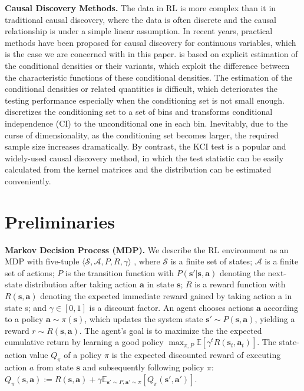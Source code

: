 \documentclass{article}
\theoremstyle{plain}
\theoremstyle{definition}
\theoremstyle{remark}
\begin{document}
\textbf{Causal Discovery Methods.}
The data in RL is more complex than it in traditional causal discovery, where the data is often discrete and the causal relationship is under a simple linear assumption.
In recent years, practical methods have been proposed for causal discovery for continuous variables, which is the case we are concerned with in this paper.
\cite{DBLP:conf/icml/SunJSF07} is based on explicit estimation of the conditional densities or their variants, which exploit the difference between the characteristic functions of these conditional densities.
The estimation of the conditional densities or related quantities is difficult, which deteriorates the testing performance especially when the conditioning set is not small enough.
\cite{DBLP:conf/aaai/Margaritis05} discretizes the conditioning set to a set of bins and transforms conditional independence (CI) to the unconditional one in each bin. 
Inevitably, due to the curse of dimensionality, as the conditioning set becomes larger, the required sample size increases dramatically.
By contrast, the KCI test \cite{kci} is a popular and widely-used causal discovery method, in which the test statistic can be easily calculated from the kernel matrices and the distribution can be estimated conveniently.

\section{Preliminaries}

\textbf{Markov Decision Process (MDP).}
We describe the RL environment as an MDP with five-tuple $\langle \mathcal{S}, \mathcal{A}, P, R, \gamma \rangle$ \cite{bellman1957markovian}, where $\mathcal{S}$ is a finite set of states;
$\mathcal{A}$ is a finite set of actions; 
$P$ is the transition function with $P(\textbf{s}'|\textbf{s}, \textbf{a})$ denoting the next-state distribution after taking action $\textbf{a}$ in state $\textbf{s}$; 
$R$ is a reward function with $R(\textbf{s}, \textbf{a})$ denoting the expected immediate reward gained by taking action a in state s; 
and $\gamma \in [0, 1]$ is a discount factor. 
An agent chooses actions $\textbf{a}$ according to a policy $\textbf{a}\sim \pi(\textbf{s})$, which updates the system state $\textbf{s}'\sim P(\textbf{s},\textbf{a})$, yielding a reward $r\sim R(\textbf{s},\textbf{a})$. 
The agent's goal is to maximize the the expected cumulative return by learning a good policy $\max_{\pi,P} \mathbb{E}[\gamma^t R(\textbf{s}_t,\textbf{a}_t)]$. 
The state-action value $Q_\pi$ of a policy $\pi$ is the expected discounted reward of executing action $a$ from state $\textbf{s}$ and subsequently following policy $\pi$:
$Q_{\pi}(\textbf{s}, \textbf{a}):=R(\textbf{s}, \textbf{a})+\gamma \mathbb{E}_{\textbf{s}' \sim P, \textbf{a}' \sim \pi}\left[Q_{\pi}\left(\textbf{s}', \textbf{a}'\right)\right]$.
\end{document}
